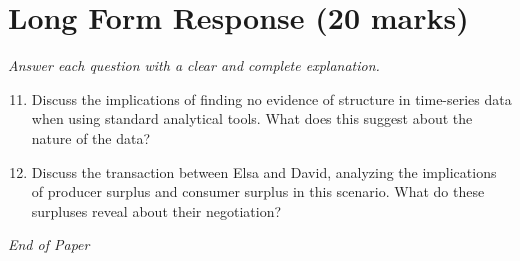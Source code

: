 \documentclass[12pt]{article}
\begin{document}
\section*{Long Form Response (20 marks)}
\textit{Answer each question with a clear and complete explanation.}
\begin{enumerate}[label=\arabic*.]
\setcounter{enumi}{10}
\item Discuss the implications of finding no evidence of structure in time-series data when using standard analytical tools. What does this suggest about the nature of the data?
\item Discuss the transaction between Elsa and David, analyzing the implications of producer surplus and consumer surplus in this scenario. What do these surpluses reveal about their negotiation?
\end{enumerate}

\vfill
\noindent\textit{End of Paper}
\end{document}
